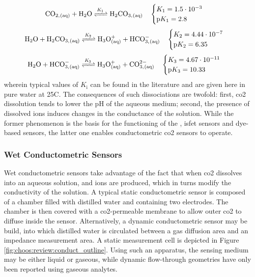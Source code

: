\begin{equation}\label{eq:choos:rev:co2_diss}
	\ce{CO_{2,(aq)} + H2O <=>[\textit{K}_1][] H2CO_{3,(aq)}} \quad \begin{cases}
		K_1 = 1.5\cdot 10^{-3} \\
		\text{p}K_1 = 2.8
	\end{cases}
\end{equation}
\begin{equation}\label{eq:choos:rev:h2co3_diss}
	\ce{H_2O + H_2CO_{3,(aq)} <=>[\textit{K}_2][] H_3O^+_{(aq)} + HCO^-_{3,(aq)}} \quad
	\begin{cases}
		K_2 = 4.44\cdot 10^{-7} \\ \text{p}K_2 = 6.35
	\end{cases}
\end{equation}
\begin{equation}\label{eq:choos:rev:hco3_diss}
	\ce{H_2O + HCO^-_{3,(aq)} <=>[\textit{K}_3][] H_3O^+_{(aq)} + CO^{2-}_{3,(aq)}} \quad
	\begin{cases}
		K_3 = 4.67\cdot 10^{-11} \\ \text{p}K_3 = 10.33
	\end{cases}
\end{equation}
wherein typical values of $K_\text{i}$ can be found in the literature\cite{millero2006, wang2010} and are given here in pure water at 25{\degree}C. The consequences of such dissociations are twofold: first, \gls{co2} dissolution tends to lower the pH of the aqueous medium; second, the presence of dissolved ions induces changes in the conductance of the solution. While the former phenomenon is the basis for the functioning of the \ssel, \gls{isfet} sensors and dye-based sensors, the latter one enables conductometric \gls{co2} sensors to operate.

\subsubsection{Wet Conductometric Sensors}\label{subsect:choos:review:wet_conduct}

Wet conductometric sensors take advantage of the fact that when \gls{co2} dissolves into an aqueous solution,  and  ions are produced, which in turns modify the conductivity of the solution\cite{baker1996}. A typical static conductometric sensor is composed of a chamber filled with distilled water and containing two electrodes. The chamber is then covered with a \gls{co2}-permeable membrane to allow outer \gls{co2} to diffuse inside the sensor\cite{varlan1997, mirtaheri2004a, mirtaheri2004b}. Alternatively, a dynamic conductometric sensor may be build, into which distilled water is circulated between a gas diffusion area and an impedance measurement area\cite{acock1995, baker1996}. A static measurement cell is depicted in Figure \ref{fig:choos:review:conduct_outline}. Using such an apparatus, the sensing medium may be either liquid or gaseous, while dynamic flow-through geometries have only been reported using gaseous analytes.

